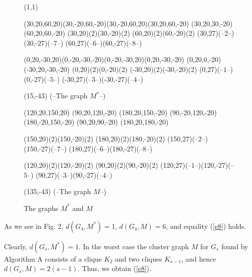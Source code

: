 \documentclass[runningheads]{llncs}
\begin{document}
\begin{figure}[htb]
\Draw%
\Scale(1,1)
\hspace*{-5mm}

\LineAt(30,20,60,20)\LineAt(30,-20,60,-20)\LineAt(30,-20,60,20)\LineAt(30,20,60,-20)
\LineAt(30,20,30,-20)\LineAt(60,20,60,-20)
\MoveTo(30,20)\PaintCircle(2)\MoveTo(30,-20)\PaintCircle(2)
\MoveTo(60,20)\PaintCircle(2)\MoveTo(60,-20)\PaintCircle(2)
\MoveTo(30,27)\Text(--$2$--)\MoveTo(30,-27)\Text(--$7$--)
\MoveTo(60,27)\Text(--$6$--)\MoveTo(60,-27)\Text(--$8$--)

\LineAt(0,20,-30,20)\LineAt(0,-20,-30,-20)\LineAt(0,-20,-30,20)\LineAt(0,20,-30,-20)
\LineAt(0,20,0,-20)\LineAt(-30,20,-30,-20)
\MoveTo(0,20)\PaintCircle(2)\MoveTo(0,-20)\PaintCircle(2)
\MoveTo(-30,20)\PaintCircle(2)\MoveTo(-30,-20)\PaintCircle(2)
\MoveTo(0,27)\Text(--$1$--)\MoveTo(0,-27)\Text(--$5$--)
\MoveTo(-30,27)\Text(--$3$--)\MoveTo(-30,-27)\Text(--$4$--)

\MoveTo(15,-43) \Text(--The graph $M^*$--)
\hspace*{1cm}

\LineAt(120,20,150,20)
\LineAt(90,20,120,-20) \LineAt(180,20,150,-20)
\LineAt(90,-20,120,-20) \LineAt(180,-20,150,-20)
\LineAt(90,20,90,-20) \LineAt(180,20,180,-20)

\MoveTo(150,20)\PaintCircle(2)\MoveTo(150,-20)\PaintCircle(2)
\MoveTo(180,20)\PaintCircle(2)\MoveTo(180,-20)\PaintCircle(2)
\MoveTo(150,27)\Text(--$2$--)\MoveTo(150,-27)\Text(--$7$--)
\MoveTo(180,27)\Text(--$6$--)\MoveTo(180,-27)\Text(--$8$--)

\MoveTo(120,20)\PaintCircle(2)\MoveTo(120,-20)\PaintCircle(2)
\MoveTo(90,20)\PaintCircle(2)\MoveTo(90,-20)\PaintCircle(2)
\MoveTo(120,27)\Text(--$1$--)\MoveTo(120,-27)\Text(--$5$--)
\MoveTo(90,27)\Text(--$3$--)\MoveTo(90,-27)\Text(--$4$--)

\MoveTo(135,-43) \Text(--The graph $M$--)


\EndDraw\caption{The graphs $M^*$ and $M$}\label{f2}
\end{figure}


As we see in Fig. 2, $d(G_4,M^*)=1$, $d(G_4,M)=6$, and equality
(\ref{e8}) holds.

Clearly, $d(G_s,M^*)=1$. In the worst case the cluster graph $M$
for $G_s$ found by Algorithm A consists of a clique $K_2$ and two
cliques $K_{s-1}$, and hence $d(G_s,M) =2(s-1)$. 
Thus, we obtain (\ref{e8}).

\medskip
\end{document}
